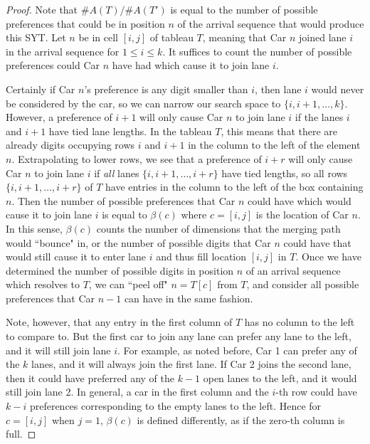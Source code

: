 \documentclass[10pt,a4paper]{amsart}
\begin{document}
\begin{proof}
    Note that $\#A(T)/\#A(T')$ is equal to the number of possible preferences that could be in position $n$ of the arrival sequence that would produce this SYT. Let $n$ be in cell $[i,j]$ of tableau $T$, meaning that Car $n$ joined lane $i$ in the arrival sequence for $1 \leq i \leq k$. It suffices to count the number of possible preferences could Car $n$ have had which cause it to join lane $i$.
    
    Certainly if Car $n$'s preference is any digit smaller than $i$, then lane $i$ would never be considered by the car, so we can narrow our search space to $\{i, i+1, \dots, k\}$. However, a preference of $i+1$ will only cause Car $n$ to join lane $i$ if the lanes $i$ and $i+1$ have tied lane lengths. In the tableau $T$, this means that there are already digits occupying rows $i$ and $i+1$ in the column to the left of the element $n$. Extrapolating to lower rows, we see that a preference of $i + r$ will only cause Car $n$ to join lane $i$ if \textit{all} lanes $\{i, i+1, \dots, i+r\}$ have tied lengths, so all rows $\{i, i+1, \dots, i+r\}$ of $T$ have entries in the column to the left of the box containing $n$. Then the number of possible preferences that Car $n$ could have which would cause it to join lane $i$ is equal to $\beta(c)$ where $c = [i,j]$ is the location of Car $n$. In this sense, $\beta(c)$ counts the number of dimensions that the merging path would ``bounce" in, or the number of possible digits that Car $n$ could have that would still cause it to enter lane $i$ and thus fill location $[i,j]$ in $T$. Once we have determined the number of possible digits in position $n$ of an arrival sequence which resolves to $T$, we can ``peel off" $n = T[c]$ from $T$, and consider all possible preferences that Car $n-1$ can have in the same fashion. 
    
    Note, however, that any entry in the first column of $T$ has no column to the left to compare to. But the first car to join any lane can prefer any lane to the left, and it will still join lane $i$. For example, as noted before, Car 1 can prefer any of the $k$ lanes, and it will always join the first lane. If Car 2 joins the second lane, then it could have preferred any of the $k-1$ open lanes to the left, and it would still join lane 2. In general, a car in the first column and the $i$-th row could have $k-i$ preferences corresponding to the empty lanes to the left. Hence for $c = [i,j]$ when $j=1$, $\beta(c)$ is defined differently, as if the zero-th column is full.
\end{proof}
\end{document}
